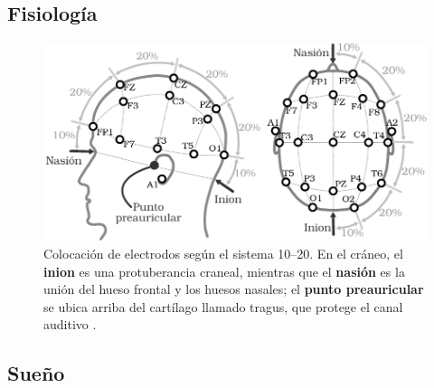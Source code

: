 \subsection{Fisiología}

\begin{figure}
\centering
\includegraphics[width=\linewidth]{./img_diagramas/cabeza_proporcionada.pdf} 
\caption{Colocaci\'on de electrodos seg\'un el sistema 10--20. En el cr\'aneo, el \textbf{inion} es 
una protuberancia craneal, mientras que el \textbf{nasi\'on} es la uni\'on del hueso frontal y los 
huesos nasales; el \textbf{punto preauricular} se ubica arriba del cart\'ilago llamado tragus, que 
protege el canal auditivo \cite{Butkov07}. 
}
\label{img1020}
\end{figure}



\subsection{Sueño}

%

